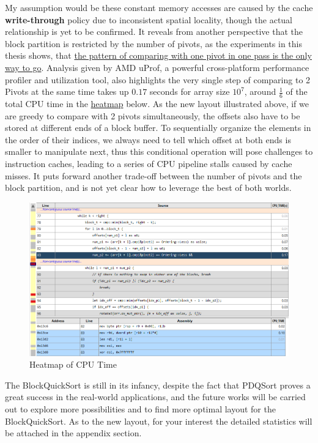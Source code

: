 \documentclass[a4paper,oneside,12pt]{book}
\begin{document}
My assumption would be these constant memory accesses are caused by the cache \textbf{write-through} policy due to inconsistent spatial locality, though the actual relationship is yet to be confirmed.
It reveals from another perspective that the block partition is restricted by the number of pivots, as the experiments in this thesis shows, that \underline{the pattern of comparing with one pivot in one pass is the only way to go\hypertarget{OnlyWayToGo}{}}.
Analysis given by AMD uProf, a powerful cross-platform performance profiler and utilization tool, also highlights the very single step of comparing to 2 Pivots at the same time takes up $0.17$ seconds for array size $10^7$, around $\frac{1}{6}$ of the total CPU time in the \hyperlink{fig:heatmap}{heatmap} below. As the new layout illustrated above, if we are greedy to compare with 2 pivots simultaneously,
the offsets also have to be stored at different ends of a block buffer. To sequentially organize the elements in the order of their indices, we always need to tell which offset at both ends is smaller to manipulate next, thus this conditional operation will pose challenges to instruction caches, leading to a series of CPU pipeline stalls caused by cache misses.
It puts forward another trade-off between the number of pivots and the block partition, and is not yet clear how to leverage the best of both worlds.
\begin{center}
    \begin{figure}[H]
        \hypertarget{fig:heatmap}{}
        \caption{Heatmap of CPU Time}
        \centering
        \includegraphics[width=1\textwidth]{heatmap.png}
    \end{figure}
\end{center}
The BlockQuickSort is still in its infancy, despite the fact that PDQSort proves a great success in the real-world applications, and the future works will be carried out to explore more possibilities and to find more optimal layout for the BlockQuickSort.
As to the new layout, for your interest the detailed statistics will be attached in the appendix section.
\end{document}
